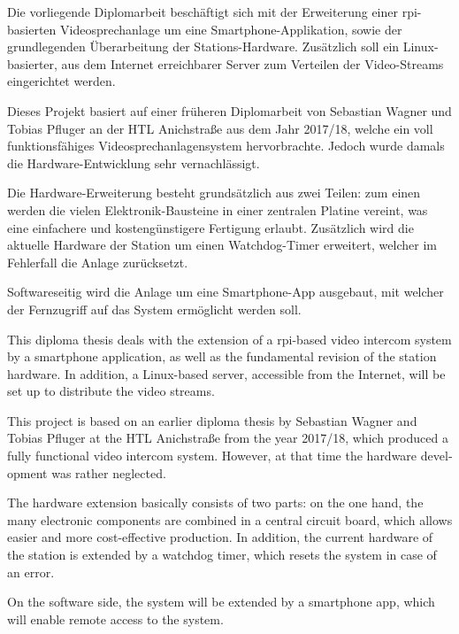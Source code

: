 Die vorliegende Diplomarbeit beschäftigt sich mit der Erweiterung einer \ac{rpi}-basierten Videosprechanlage um eine Smartphone-Applikation, sowie der grundlegenden Überarbeitung der Stations-Hardware.
Zusätzlich soll ein Linux-basierter, aus dem Internet erreichbarer Server zum Verteilen der Video-Streams eingerichtet werden.
\par
Dieses Projekt basiert auf einer früheren Diplomarbeit von Sebastian Wagner und Tobias Pfluger an der HTL Anichstraße aus dem Jahr 2017/18, welche ein voll funktionsfähiges Videosprechanlagensystem hervorbrachte.
Jedoch wurde damals die Hardware-Entwicklung sehr vernachlässigt.
\par
Die Hardware-Erweiterung besteht grundsätzlich aus zwei Teilen: zum einen werden die vielen Elektronik-Bausteine in einer zentralen Platine vereint, was eine einfachere und kostengünstigere Fertigung erlaubt.
Zusätzlich wird die aktuelle Hardware der Station um einen Watchdog-Timer erweitert, welcher im Fehlerfall die Anlage zurücksetzt.
\par
Softwareseitig wird die Anlage um eine Smartphone-App ausgebaut, mit welcher der Fernzugriff auf das System ermöglicht werden soll.
\par

\vspace*{1cm}
\begin{otherlanguage}{british}
	This diploma thesis deals with the extension of a \ac{rpi}-based video intercom system by a smartphone application, as well as the fundamental revision of the station hardware.
	In addition, a Linux-based server, accessible from the Internet, will be set up to distribute the video streams.
	\par
	This project is based on an earlier diploma thesis by Sebastian Wagner and Tobias Pfluger at the HTL Anichstraße from the year 2017/18, which produced a fully functional video intercom system.
	However, at that time the hardware development was rather neglected.
	\par
	The hardware extension basically consists of two parts: on the one hand, the many electronic components are combined in a central circuit board, which allows easier and more cost-effective production.
	In addition, the current hardware of the station is extended by a watchdog timer, which resets the system in case of an error.
	\par
	On the software side, the system will be extended by a smartphone app, which will enable remote access to the system.
	\par
\end{otherlanguage}